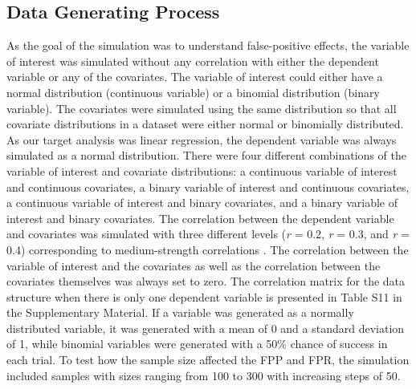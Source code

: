 \subsection{Data Generating Process}
As the goal of the simulation was to understand false-positive effects, the variable of interest was simulated without any correlation with either the dependent variable or any of the covariates. The variable of interest could either have a normal distribution (continuous variable) or a binomial distribution (binary variable). The covariates were simulated using the same distribution so that all covariate distributions in a dataset were either normal or binomially distributed. As our target analysis was linear regression, the dependent variable was always simulated as a normal distribution. There were four different combinations of the variable of interest and covariate distributions: a continuous variable of interest and continuous covariates, a binary variable of interest and continuous covariates, a continuous variable of interest and binary covariates, and a binary variable of interest and binary covariates. The correlation between the dependent variable and covariates was simulated with three different levels (\textit{r} = 0.2, \textit{r} = 0.3, and \textit{r} = 0.4) corresponding to medium-strength correlations \citep{Cohen1989}. The correlation between the variable of interest and the covariates as well as the correlation between the covariates themselves was always set to zero. The correlation matrix for the data structure when there is only one dependent variable is presented in Table S11 in the Supplementary Material. If a variable was generated as a normally distributed variable, it was generated with a mean of 0 and a standard deviation of 1, while binomial variables were generated with a 50\% chance of success in each trial. To test how the sample size affected the FPP and FPR, the simulation included samples with sizes ranging from 100 to 300 with increasing steps of 50. 

